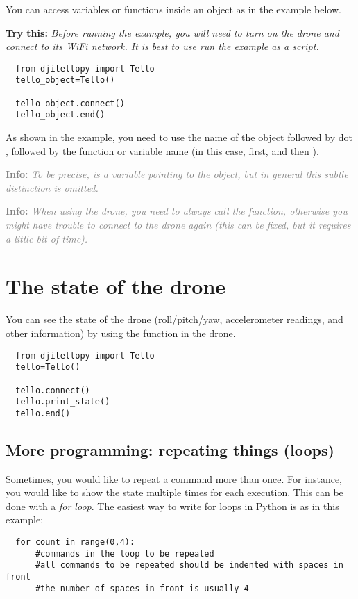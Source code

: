 \documentclass[12pt]{article}
\newcommand{\textsfbf}[1]{\textsf{\textbf{#1}}}
\newcommand{\info}[1]{\par\textcolor{gray}{\textsfbf{Info:} \emph{#1}}}
\newcommand{\trythis}[1]{\par\textcolor{DodgerBlue4}{\textsfbf{Try this:} \emph{#1}}}
\begin{document}
You can access variables or functions inside an object as in the example below.

\trythis{Before running the example, you will need to turn on the drone and connect to its WiFi network. It is best to use run the example as a script.}

\begin{lstlisting}
  from djitellopy import Tello
  tello_object=Tello()
  
  tello_object.connect()
  tello_object.end()
\end{lstlisting}

As shown in the example, you need to use the name of the object  followed by dot , followed by the function or variable name (in this case,  first, and then ).

\info{To be precise,  is a variable pointing to the object, but in general this subtle distinction is omitted.}

\info{When using the drone, you need to always call the \var{end()} function, otherwise you might have trouble to connect to the drone again (this can be fixed, but it requires a little bit of time).}


\section{The state of the drone}

You can see the state of the drone (roll/pitch/yaw, accelerometer readings, and other information) by using the function  in the drone.

\begin{lstlisting}
  from djitellopy import Tello
  tello=Tello()
  
  tello.connect()
  tello.print_state()
  tello.end()
\end{lstlisting}

\subsection{More programming: repeating things (loops)}
Sometimes, you would like to repeat a command more than once. For instance, you would like to show the state multiple times for each execution. This can be done with a \emph{for loop}. The easiest way to write for loops in Python is as in this example:
\begin{lstlisting}
  for count in range(0,4):
      #commands in the loop to be repeated
      #all commands to be repeated should be indented with spaces in front
      #the number of spaces in front is usually 4
\end{lstlisting}
\end{document}
